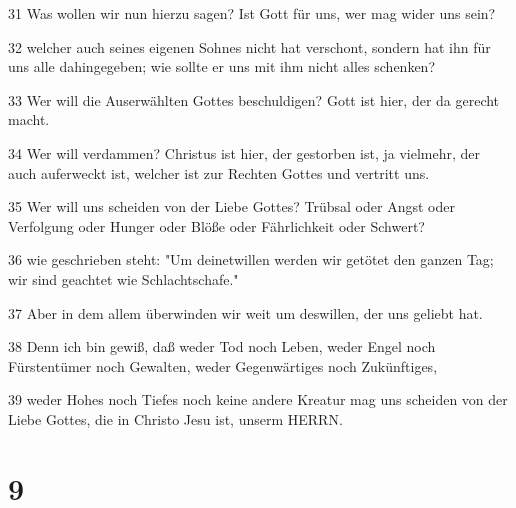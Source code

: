 \par 31 Was wollen wir nun hierzu sagen? Ist Gott für uns, wer mag wider uns sein?
\par 32 welcher auch seines eigenen Sohnes nicht hat verschont, sondern hat ihn für uns alle dahingegeben; wie sollte er uns mit ihm nicht alles schenken?
\par 33 Wer will die Auserwählten Gottes beschuldigen? Gott ist hier, der da gerecht macht.
\par 34 Wer will verdammen? Christus ist hier, der gestorben ist, ja vielmehr, der auch auferweckt ist, welcher ist zur Rechten Gottes und vertritt uns.
\par 35 Wer will uns scheiden von der Liebe Gottes? Trübsal oder Angst oder Verfolgung oder Hunger oder Blöße oder Fährlichkeit oder Schwert?
\par 36 wie geschrieben steht: "Um deinetwillen werden wir getötet den ganzen Tag; wir sind geachtet wie Schlachtschafe."
\par 37 Aber in dem allem überwinden wir weit um deswillen, der uns geliebt hat.
\par 38 Denn ich bin gewiß, daß weder Tod noch Leben, weder Engel noch Fürstentümer noch Gewalten, weder Gegenwärtiges noch Zukünftiges,
\par 39 weder Hohes noch Tiefes noch keine andere Kreatur mag uns scheiden von der Liebe Gottes, die in Christo Jesu ist, unserm HERRN.

\chapter{9}

